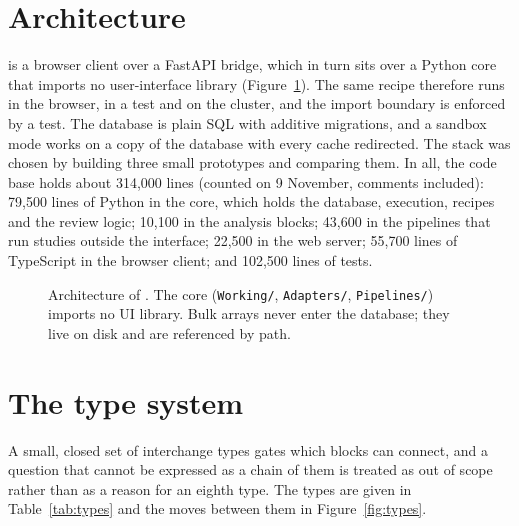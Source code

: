 \section{Architecture}
\label{sec:architecture}

\tool{} is a browser client over a FastAPI bridge, which in turn sits over a Python core that imports no user-interface library (Figure~\ref{fig:architecture}). The same recipe therefore runs in the browser, in a test and on the cluster, and the import boundary is enforced by a test. The database is plain SQL with additive migrations, and a sandbox mode works on a copy of the database with every cache redirected. The stack was chosen by building three small prototypes and comparing them. In all, the code base holds about 314,000 lines (counted on 9 November, comments included): 79,500 lines of Python in the core, which holds the database, execution, recipes and the review logic; 10,100 in the analysis blocks; 43,600 in the pipelines that run studies outside the interface; 22,500 in the web server; 55,700 lines of TypeScript in the browser client; and 102,500 lines of tests.

\begin{figure}[htbp]
\centering

\caption[{Architecture of \tool{}.}]{Architecture of \tool{}. The core (\texttt{Working/}, \texttt{Adapters/}, \texttt{Pipelines/}) imports no UI library. Bulk arrays never enter the database; they live on disk and are referenced by path.}
\label{fig:architecture}
\end{figure}

\section{The type system}
\label{sec:types}

A small, closed set of interchange types gates which blocks can connect, and a question that cannot be expressed as a chain of them is treated as out of scope rather than as a reason for an eighth type. The types are given in Table~\ref{tab:types} and the moves between them in Figure~\ref{fig:types}.

